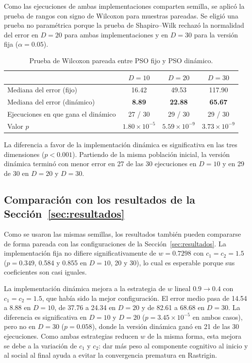 Como las ejecuciones de ambas implementaciones comparten semilla, se aplicó la prueba de rangos con signo de Wilcoxon para muestras pareadas. Se eligió una prueba no paramétrica porque la prueba de Shapiro--Wilk rechazó la normalidad del error en $D=20$ para ambas implementaciones y en $D=30$ para la versión fija ($\alpha = 0.05$).

\begin{table}[H]
\centering
\caption{Prueba de Wilcoxon pareada entre PSO fijo y PSO dinámico.}
\label{tab:wilcoxon_fijo_dinamico}
\small
\begin{tabular}{lccc}
\toprule
 & $D=10$ & $D=20$ & $D=30$ \\
\midrule
Mediana del error (fijo) & 16.42 & 49.53 & 117.90 \\
Mediana del error (dinámico) & \textbf{8.89} & \textbf{22.88} & \textbf{65.67} \\
Ejecuciones en que gana el dinámico & 27 / 30 & 29 / 30 & 29 / 30 \\
Valor $p$ & $1.80\times10^{-5}$ & $5.59\times10^{-9}$ & $3.73\times10^{-9}$ \\
\bottomrule
\end{tabular}
\end{table}

La diferencia a favor de la implementación dinámica es significativa en las tres dimensiones ($p < 0.001$). Partiendo de la misma población inicial, la versión dinámica terminó con menor error en 27 de las 30 ejecuciones en $D=10$ y en 29 de 30 en $D=20$ y $D=30$.

\subsection{Comparación con los resultados de la Sección~\ref{sec:resultados}}

Como se usaron las mismas semillas, los resultados también pueden compararse de forma pareada con las configuraciones de la Sección~\ref{sec:resultados}. La implementación fija no difiere significativamente de $w = 0.7298$ con $c_1 = c_2 = 1.5$ ($p = 0.349$, 0.584 y 0.855 en $D = 10$, 20 y 30), lo cual es esperable porque sus coeficientes son casi iguales.

La implementación dinámica mejora a la estrategia de $w$ lineal $0.9\to0.4$ con $c_1 = c_2 = 1.5$, que había sido la mejor configuración. El error medio pasa de 14.54 a 8.88 en $D=10$, de 37.76 a 24.34 en $D=20$ y de 82.61 a 68.68 en $D=30$. La diferencia es significativa en $D=10$ y $D=20$ ($p = 3.45\times10^{-5}$ en ambos casos), pero no en $D=30$ ($p = 0.058$), donde la versión dinámica ganó en 21 de las 30 ejecuciones. Como ambas estrategias reducen $w$ de la misma forma, esta mejora se debe a la variación de $c_1$ y $c_2$: dar más peso al componente cognitivo al inicio y al social al final ayuda a evitar la convergencia prematura en Rastrigin.